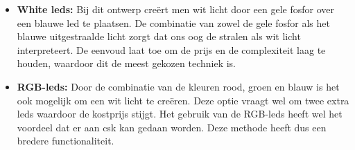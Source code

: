 			\begin{itemize}
				\item \textbf{White \glspl{led}:} Bij dit ontwerp cre\"ert men wit licht door een gele fosfor over een blauwe \gls{led} te plaatsen. De combinatie van zowel de gele fosfor als het blauwe uitgestraalde licht zorgt dat ons oog de stralen als wit licht interpreteert. De eenvoud laat toe om de prijs en de complexiteit laag te houden, waardoor dit de meest gekozen techniek is.
				
				\item \textbf{RGB-\glspl{led}:} Door de combinatie van de kleuren rood, groen en blauw is het ook mogelijk om een wit licht te cre\"eren. Deze optie vraagt wel om twee extra \glspl{led} waardoor de kostprijs stijgt. Het gebruik van de RGB-\glspl{led} heeft wel het voordeel dat er aan \gls{csk} kan gedaan worden. Deze methode heeft dus een bredere functionaliteit.
			\end{itemize}
		
